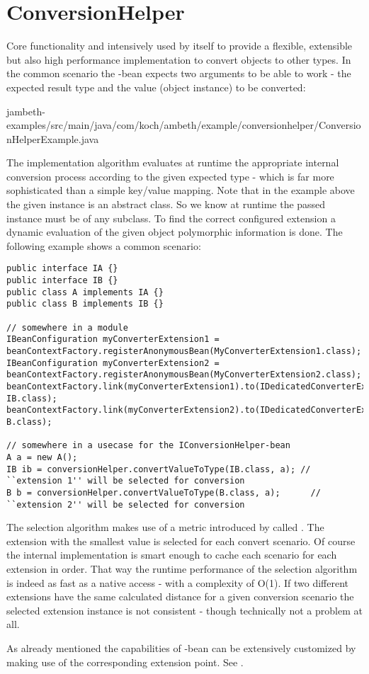 \section{ConversionHelper}
\label{feature:ConversionHelper}
\ClearAPI
Core functionality and intensively used by \AMBETH{} itself to provide a flexible, extensible but also high performance implementation to convert objects to other types. In the common scenario the -bean expects two arguments to be able to work - the expected result type and the value (object instance) to be converted:

{jambeth-examples/src/main/java/com/koch/ambeth/example/conversionhelper/ConversionHelperExample.java}

The implementation algorithm evaluates at runtime the appropriate internal conversion process according to the given expected type - which is far more sophisticated than a simple key/value mapping. Note that in the example above the given  instance is an abstract class. So we know at runtime the passed instance must be of any subclass. To find the correct configured extension a dynamic evaluation of the given object polymorphic information is done. The following example shows a common scenario:

\begin{lstlisting}[style=Java]
public interface IA {}
public interface IB {}
public class A implements IA {}
public class B implements IB {}

// somewhere in a module
IBeanConfiguration myConverterExtension1 = beanContextFactory.registerAnonymousBean(MyConverterExtension1.class);
IBeanConfiguration myConverterExtension2 = beanContextFactory.registerAnonymousBean(MyConverterExtension2.class);
beanContextFactory.link(myConverterExtension1).to(IDedicatedConverterExtendable.class).with(IA.class, IB.class);
beanContextFactory.link(myConverterExtension2).to(IDedicatedConverterExtendable.class).with(IA.class, B.class);

// somewhere in a usecase for the IConversionHelper-bean
A a = new A();
IB ib = conversionHelper.convertValueToType(IB.class, a); // ``extension 1'' will be selected for conversion
B b = conversionHelper.convertValueToType(B.class, a);		// ``extension 2'' will be selected for conversion
\end{lstlisting}

The selection algorithm makes use of a metric introduced by \AMBETH{} called . The extension with the smallest value is selected for each convert scenario. Of course the internal implementation is smart enough to cache each scenario for each extension in order. That way the runtime performance of the selection algorithm is indeed as fast as a native  access - with a complexity of O(1). If two different extensions have the same calculated distance for a given conversion scenario the selected extension instance is not consistent - though technically not a problem at all.

As already mentioned the capabilities of -bean can be extensively customized by making use of the corresponding extension point. See .